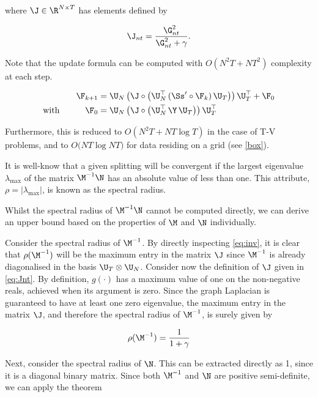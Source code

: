 \noindent where $\J \in \R^{N \times T}$ has elements defined by

\begin{equation}
    \label{eq:Jnt}
    \J_{nt} = \frac{\G_{nt}^2}{\G_{nt}^2 + \gamma}.
\end{equation}

Note that the update formula can be computed with $O(N^2T + NT^2)$ complexity at each step.  


\begin{align}
    \label{eq:update3}
    \F_{k+1} & = \U_N \, \big( \J  \circ \big( \U_N^\top \, (\Ss' \circ \F_{k})\, \U_T \big) \big) \, \U_T^\top + \F_0 \\
    \label{eq:update4}
    \text{with} \quad\quad\quad \F_0 & = \U_N \, \big( \J  \circ \big( \U_N^\top \, \Y \, \U_T \big) \big) \, \U_T^\top 
\end{align}


Furthermore, this is reduced to $O(N^2T + NT \log T)$ in the case of T-V problems, and to $O\big(NT \log NT \big)$ for data residing on a grid (see \cref{box}). 


It is well-know that a given splitting will be convergent if the largest eigenvalue $\lambda_{\text{max}}$ of the matrix $\M^{-1}\N$ has an absolute value of less than one. This attribute, $\rho = |\lambda_{\text{max}}|$, is known as the spectral radius. 

Whilst the spectral radius of $\M^{-1}\N$ cannot be computed directly, we can derive an upper bound based on the properties of $\M$ and $\N$ individually. 

Consider the spectral radius of $\M^{-1}$. By directly inspecting \cref{eq:inv}, it is clear that $\rho(\M^{-1})$ will be the maximum entry in the matrix $\J$ since $\M^{-1}$ is already diagonalised in the basis $\U_T \otimes \U_N$. Consider now the definition of $\J$ given in \cref{eq:Jnt}. By definition, $g(\cdot)$ has a maximum value of one on the non-negative reals, achieved when its argument is zero. Since the graph Laplacian is guaranteed to have at least one zero eigenvalue, the maximum entry in the matrix $\J$, and therefore the spectral radius of $\M^{-1}$, is surely given by

\begin{equation}
    \rho(\M^{-1}) = \frac{1}{1 + \gamma}
\end{equation}

Next, consider the spectral radius of $\N$. This can be extracted directly as 1, since it is a diagonal binary matrix. Since both $\M^{-1}$ and $\N$ are positive semi-definite, we can apply the theorem

